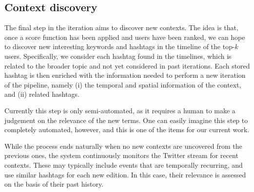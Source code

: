\subsection{Context discovery} \label{sec:context-discovery}


The final step in the iteration aims to discover new contexts. 
The idea is that, once a score function has been applied and users have been ranked, we can hope to discover new interesting keywords and hashtags in the timeline of the top-$k$ users.
Specifically,  we consider each hashtag found in the timelines, which is related to the broader topic and not yet considered in past iterations.
Each stored hashtag is then enriched with the information needed to perform a new iteration of the pipeline, namely (i) the temporal and spatial information of the context, and (ii) related hashtags.

Currently this step is only semi-automated, as it requires a human to make a judgement on the relevance of the new terms. 
One can easily imagine this step to completely automated, however, and this is one of the items for our current work.

While the process ends naturally when no new contexts are uncovered from the previous ones, the system continuously monitors the Twitter stream for recent contexts. These may typically include events that are temporally recurring, and use similar hashtags for each new edition. In this case, their relevance is assessed on the basis of their past history.